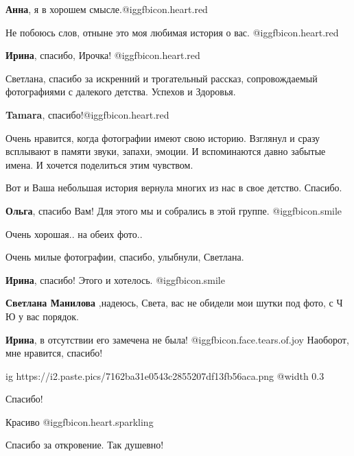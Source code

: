 \begin{itemize}
\begin{itemize}
\textbf{Анна}, я в хорошем смысле.@igg{fbicon.heart.red}
\end{itemize} %

Не побоюсь слов, отныне это моя любимая история о вас. @igg{fbicon.heart.red}

\textbf{Ирина}, спасибо, Ирочка! @igg{fbicon.heart.red}

Светлана, спасибо за искренний и трогательный рассказ, сопровождаемый
фотографиями с далекого детства. Успехов и Здоровья.

\textbf{Tamara}, спасибо!@igg{fbicon.heart.red}


Очень нравится, когда фотографии имеют свою историю. Взглянул и сразу всплывают
в памяти звуки, запахи, эмоции. И вспоминаются давно забытые имена. И хочется
поделиться этим чувством.

Вот и Ваша небольшая история вернула многих из нас в свое детство. Спасибо.

\begin{itemize} %
\textbf{Ольга}, спасибо Вам! Для этого мы и собрались в этой группе. @igg{fbicon.smile} 
\end{itemize} %

Очень хорошая.. на обеих фото..

Очень милые фотографии, спасибо, улыбнули, Светлана.

\begin{itemize} %
\textbf{Ирина}, спасибо! Этого и хотелось. @igg{fbicon.smile} 

\textbf{Светлана Манилова} ,надеюсь, Света, вас не обидели мои шутки под фото, с Ч Ю у вас порядок.

\textbf{Ирина}, в отсутствии его замечена не была! @igg{fbicon.face.tears.of.joy} Наоборот, мне нравится, спасибо!
\end{itemize} %


\ifcmt
  ig https://i2.paste.pics/7162ba31e0543c2855207df13fb56aca.png
  @width 0.3
\fi

Спасибо!

Красиво @igg{fbicon.heart.sparkling} 

Спасибо за откровение. Так душевно!


\end{itemize}
